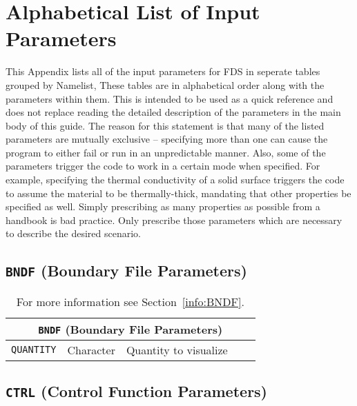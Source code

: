 \documentclass[11pt]{book}
\newcommand{\ct}{\tt\small}
\begin{document}
\chapter{Alphabetical List of Input Parameters}%

This Appendix lists all of the input parameters for FDS in seperate tables grouped by Namelist,
These tables are in alphabetical order along with the parameters within them.
This is intended to be used as a quick reference and does not replace reading
the detailed description of the parameters in the main body of this guide.
The reason for this statement is that many of the listed parameters are mutually exclusive -- specifying more than
one can cause the program to either fail or run in an unpredictable manner. Also, some of the parameters trigger the
code to work in a certain mode when specified. For example, specifying the thermal conductivity of
a solid surface triggers the code to assume the material to be thermally-thick, mandating that other
properties be specified as well. Simply prescribing as many properties as possible from a handbook is bad practice.
Only prescribe those parameters which are necessary to describe the desired scenario.


\clearpage

\section{\texorpdfstring{{\tt BNDF}}{BNDF} (Boundary File Parameters)}

\hspace{1in}

\begin{table}[H]
\caption{For more information see Section~\ref{info:BNDF}.}\label{tbl:BNDF}
\noindent
\begin{tabular*}{6.5in}{@{\extracolsep\fill}|l|l|l|l|l|}
\hline
\multicolumn{5}{|c|}{{\ct BNDF} (Boundary File Parameters)} \\ \hline \hline
{\ct QUANTITY}     & Character   & Quantity to visualize &           &     \\ \hline
\end{tabular*}
\end{table}

\vspace{\baselineskip}

\vfill


\section{\texorpdfstring{{\tt CTRL}}{CTRL} (Control Function Parameters)}
\end{document}
